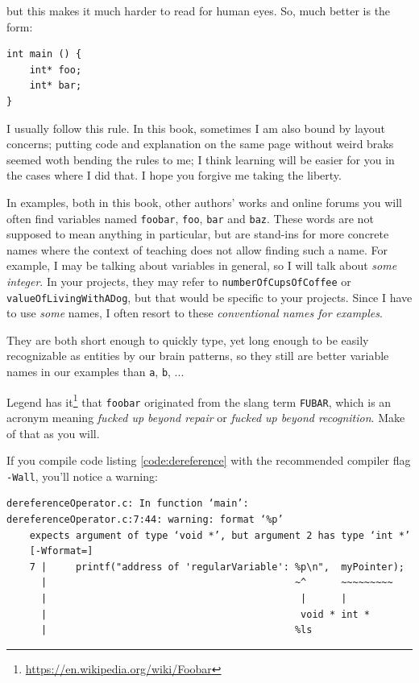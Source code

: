 {{{{\begin{hintbox}[]
but this makes it much harder to read for human eyes. So, much better is the form:
\begin{codebox}
\begin{verbatim}
int main () {
    int* foo;
    int* bar;
}
\end{verbatim}
\end{codebox}

I usually follow this rule. In this book, sometimes I am also bound by layout concerns; putting code and explanation on the same page without weird braks seemed woth bending the rules to me; I think learning will be easier for you in the cases where I did that. I hope you forgive me taking the liberty.
\end{hintbox}

\begin{hintbox}
In examples, both in this book, other authors' works and online forums you will often find variables named \texttt{foobar}, \texttt{foo}, \texttt{bar} and \texttt{baz}. These words are not supposed to mean anything in particular, but are stand-ins for more concrete names where the context of teaching does not allow finding such a name. For example, I may be talking about variables in general, so I will talk about \emph{some integer}. In your projects, they may refer to \texttt{numberOfCupsOfCoffee} or \texttt{valueOfLivingWithADog}, but that would be specific to your projects. Since I have to use \emph{some} names, I often resort to these \emph{conventional names for examples}.

They are both short enough to quickly type, yet long enough to be easily recognizable as entities by our brain patterns, so they still are better variable names in our examples than \texttt{a}, \texttt{b}, ...

Legend has it\footnote{\url{https://en.wikipedia.org/wiki/Foobar}} that \texttt{foobar} originated from the slang term \texttt{FUBAR}, which is an acronym meaning \emph{fucked up beyond repair} or \emph{fucked up beyond recognition}. Make of that as you will.
\end{hintbox}

\begin{plusbox}
If you compile code listing \ref{code:dereference} with the recommended compiler flag \texttt{-Wall}, you'll notice a warning:
\vspace{3pt}

\begin{cmdbox}
\begin{verbatim}
dereferenceOperator.c: In function ‘main’:
dereferenceOperator.c:7:44: warning: format ‘%p’ 
    expects argument of type ‘void *’, but argument 2 has type ‘int *’ 
    [-Wformat=]
    7 |     printf("address of 'regularVariable': %p\n",  myPointer);
      |                                           ~^      ~~~~~~~~~
      |                                            |      |
      |                                            void * int *
      |                                           %ls
\end{verbatim}
\end{cmdbox}


\end{plusbox}}}}}
